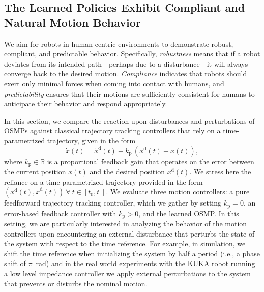 \subsection{The Learned Policies Exhibit Compliant and Natural Motion Behavior}
We aim for robots in human-centric environments to demonstrate robust, compliant, and predictable behavior. Specifically, \emph{robustness} means that if a robot deviates from its intended path—perhaps due to a disturbance—it will always converge back to the desired motion. \emph{Compliance} indicates that robots should exert only minimal forces when coming into contact with humans, and \emph{predictability} ensures that their motions are sufficiently consistent for humans to anticipate their behavior and respond appropriately.

In this section, we compare the reaction upon disturbances and perturbations of \glspl{OSMP} against classical trajectory tracking controllers that rely on a time-parametrized trajectory, given in the form
\begin{equation}
    \dot{x}(t) = \dot{x}^\mathrm{d}(t) + k_\mathrm{p} \, (x^\mathrm{d}(t) - x(t)),
\end{equation}
where $k_\mathrm{p} \in \mathbb{R}$ is a proportional feedback gain that operates on the error between the current position $x(t)$ and the desired position $x^\mathrm{d}(t)$. We stress here the reliance on a time-parametrized trajectory provided in the form $(x^\mathrm{d}(t),\dot{x}^\mathrm{d}(t)) \: \forall \: t \in [t_0, t_\mathrm{f}]$. 
We evaluate three motion controllers: a pure feedforward trajectory tracking controller, which we gather by setting $k_\mathrm{p} = 0$, an error-based feedback controller with $k_\mathrm{p} > 0$, and the learned \gls{OSMP}.
In this setting, we are particularly interested in analyzing the behavior of the motion controllers upon encountering an external disturbance that perturbs the state of the system with respect to the time reference. For example, in simulation, we shift the time reference when initializing the system by half a period (i.e., a phase shift of $\pi$~rad) and in the real world experiments with the KUKA robot running a low level impedance controller we apply external perturbations to the system that prevents or disturbs the nominal motion.

